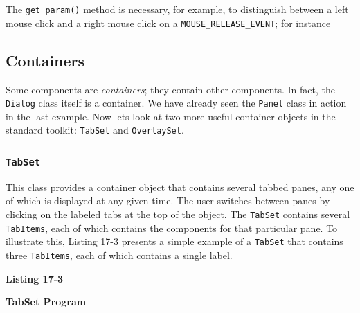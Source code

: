 The \texttt{get\_param()} method is necessary, for example, to
distinguish between a left mouse click and a right mouse click on a
\texttt{MOUSE\_RELEASE\_EVENT}; for instance 


\subsection{Containers}

Some components are \textit{containers}; they contain other components.
In fact, the \texttt{Dialog} class itself is a container. We have
already seen the \texttt{Panel} class in action in the last example.
Now let{\textquotesingle}s look at two more useful container objects in the standard toolkit: \texttt{TabSet}
and \texttt{OverlaySet}.

\subsubsection[TabSet]{\texttt{TabSet}}
This class provides a container object that contains several tabbed panes, any one of which is displayed at any given
time. The user switches between panes by clicking on the labeled tabs
at the top of the object. The \texttt{TabSet} contains several
\texttt{TabItems}, each of which contains the components for that
particular pane. To illustrate this, Listing 17-3 presents a simple
example of a \texttt{TabSet} that contains three \texttt{TabItems},
each of which contains a single label.

\bigskip

{\sffamily\bfseries
Listing 17-3}

{\sffamily\bfseries
TabSet Program}

